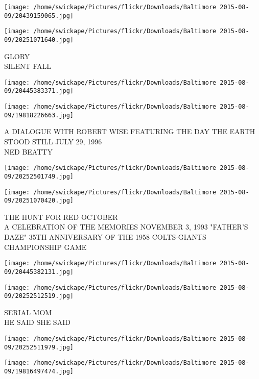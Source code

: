 \documentclass[10pt,letterpaper]{article}
\begin{document}
\texttt{[image: /home/swickape/Pictures/flickr/Downloads/Baltimore 2015-08-09/20439159065.jpg]}

\vspace{0.25in}
\texttt{[image: /home/swickape/Pictures/flickr/Downloads/Baltimore 2015-08-09/20251071640.jpg]}

GLORY\\
SILENT FALL\\
\pagebreak

\texttt{[image: /home/swickape/Pictures/flickr/Downloads/Baltimore 2015-08-09/20445383371.jpg]}

\vspace{0.25in}
\texttt{[image: /home/swickape/Pictures/flickr/Downloads/Baltimore 2015-08-09/19818226663.jpg]}

A DIALOGUE WITH ROBERT WISE FEATURING THE DAY THE EARTH STOOD STILL JULY 29, 1996\\
NED BEATTY\\
\pagebreak

\texttt{[image: /home/swickape/Pictures/flickr/Downloads/Baltimore 2015-08-09/20252501749.jpg]}

\vspace{0.25in}
\texttt{[image: /home/swickape/Pictures/flickr/Downloads/Baltimore 2015-08-09/20251070420.jpg]}

THE HUNT FOR RED OCTOBER\\
A CELEBRATION OF THE MEMORIES NOVEMBER 3, 1993 "FATHER'S DAZE" 35TH ANNIVERSARY OF THE 1958 COLTS{-}GIANTS CHAMPIONSHIP GAME\\
\pagebreak

\texttt{[image: /home/swickape/Pictures/flickr/Downloads/Baltimore 2015-08-09/20445382131.jpg]}

\vspace{0.25in}
\texttt{[image: /home/swickape/Pictures/flickr/Downloads/Baltimore 2015-08-09/20252512519.jpg]}

SERIAL MOM\\
HE SAID SHE SAID\\
\pagebreak

\texttt{[image: /home/swickape/Pictures/flickr/Downloads/Baltimore 2015-08-09/20252511979.jpg]}

\vspace{0.25in}
\texttt{[image: /home/swickape/Pictures/flickr/Downloads/Baltimore 2015-08-09/19816497474.jpg]}
\end{document}
